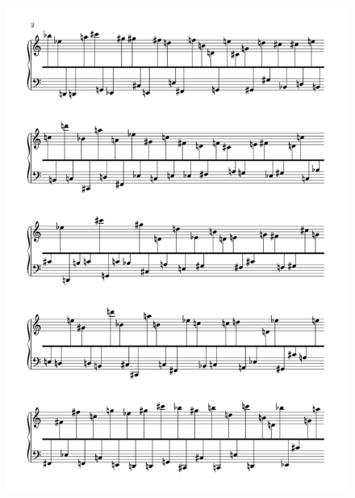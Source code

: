  \begin{figure}[H]
\begin{center}
\includegraphics[width=\textwidth]{mp/img/a-1.png}
\end{center}
\end{figure}

